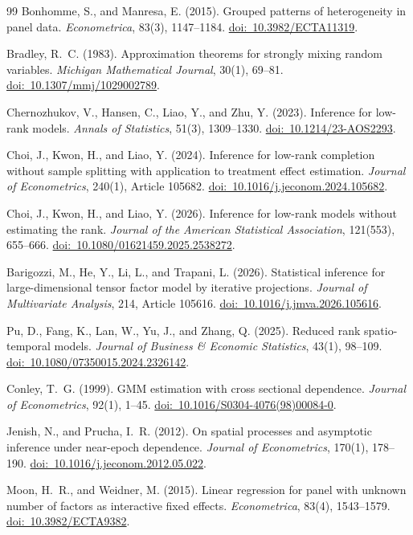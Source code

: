 \documentclass[11pt]{article}
\numberwithin{equation}{section}
\theoremstyle{remark}
\newcommand{\doilink}[1]{\href{https://doi.org/#1}{doi:\ #1}}
\begin{document}
\begin{singlespace}
\begin{thebibliography}{99}
Bonhomme, S., and Manresa, E. (2015).
Grouped patterns of heterogeneity in panel data.
\emph{Econometrica}, 83(3), 1147--1184.
\doilink{10.3982/ECTA11319}.

Bradley, R.~C. (1983).
Approximation theorems for strongly mixing random variables.
\emph{Michigan Mathematical Journal}, 30(1), 69--81.
\doilink{10.1307/mmj/1029002789}.

Chernozhukov, V., Hansen, C., Liao, Y., and Zhu, Y. (2023).
Inference for low-rank models.
\emph{Annals of Statistics}, 51(3), 1309--1330.
\doilink{10.1214/23-AOS2293}.

Choi, J., Kwon, H., and Liao, Y. (2024).
Inference for low-rank completion without sample splitting with application to treatment effect estimation.
\emph{Journal of Econometrics}, 240(1), Article 105682.
\doilink{10.1016/j.jeconom.2024.105682}.

Choi, J., Kwon, H., and Liao, Y. (2026).
Inference for low-rank models without estimating the rank.
\emph{Journal of the American Statistical Association}, 121(553), 655--666.
\doilink{10.1080/01621459.2025.2538272}.

Barigozzi, M., He, Y., Li, L., and Trapani, L. (2026).
Statistical inference for large-dimensional tensor factor model by iterative projections.
\emph{Journal of Multivariate Analysis}, 214, Article 105616.
\doilink{10.1016/j.jmva.2026.105616}.

Pu, D., Fang, K., Lan, W., Yu, J., and Zhang, Q. (2025).
Reduced rank spatio-temporal models.
\emph{Journal of Business \& Economic Statistics}, 43(1), 98--109.
\doilink{10.1080/07350015.2024.2326142}.

Conley, T.~G. (1999).
GMM estimation with cross sectional dependence.
\emph{Journal of Econometrics}, 92(1), 1--45.
\doilink{10.1016/S0304-4076(98)00084-0}.



Jenish, N., and Prucha, I.~R. (2012).
On spatial processes and asymptotic inference under near-epoch dependence.
\emph{Journal of Econometrics}, 170(1), 178--190.
\doilink{10.1016/j.jeconom.2012.05.022}.

Moon, H.~R., and Weidner, M. (2015).
Linear regression for panel with unknown number of factors as interactive fixed effects.
\emph{Econometrica}, 83(4), 1543--1579.
\doilink{10.3982/ECTA9382}.




\end{thebibliography}
\end{singlespace}
\end{document}
